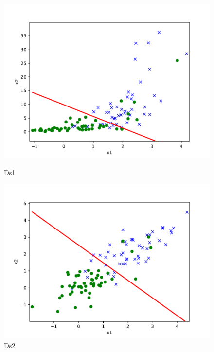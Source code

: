 \begin{answer}
	\begin{figure}[htpb]
		\centering
		\begin{minipage}[b]{0.46\linewidth}
			\centering
			\includegraphics[width=\linewidth]{ds1.pdf}
			\caption{Ds1}%
			\label{fig:ds1}
		\end{minipage}
		\begin{minipage}[b]{0.46\linewidth}
			\centering
			\includegraphics[width=\linewidth]{ds2.pdf}
			\caption{Ds2}%
			\label{fig:ds2}
		\end{minipage}
	\end{figure}
\end{answer}

